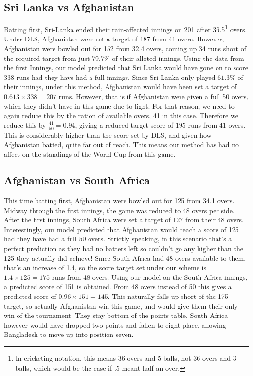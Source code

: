 \subsection{Sri Lanka vs Afghanistan}
Batting first, Sri-Lanka ended their rain-affected innings on 201 after 36.5\footnote{In cricketing notation, this means 36 overs and 5 balls, not 36 overs and 3 balls, which would be the case if .5 meant half an over.} overs.
Under DLS, Afghanistan were set a target of 187 from 41 overs. However, Afghanistan were bowled out for 152 from 32.4 overs, coming up 34 runs short of the required target from just 79.7\% of their alloted innings. 
Using the data from the first Innings, our model predicted that Sri Lanka would have gone on to score 338 runs had they have had a full innings. Since Sri Lanka only played $61.3\%$ of their innings, under this method, Afghanistan 
would have been set a target of $0.613 \times 338 = 207 \text{ runs}$. However, that is if Afghanistan were given a full 50 overs, which they didn't have in this game due to light. For that reason, we need 
to again reduce this by the ration of available overs, 41 in this case. Therefore we reduce this by $\frac{41}{50}=0.94$, giving a reduced target score of $195$ runs from 41 overs. This is considerably higher than the 
score set by DLS, and given how Afghanistan batted, quite far out of reach. This means our method has had no affect on the standings of the World Cup from this game.

\subsection{Afghanistan vs South Africa}
This time batting first, Afghanistan were bowled out for 125 from 34.1 overs. Midway through the first innings, the game was reduced to 48 overs per side. After the first innings, South Africa were set 
a target of 127 from their 48 overs. Interestingly, our model predicted that Afghanistan would reach a score of 125 had they have had a full 50 overs. Strictly speaking, in this scenario that's a perfect prediction 
as they had no batters left so couldn't go any higher than the 125 they actually did achieve! Since South Africa had 48 overs available to them, that's an increase of 1.4, so the score target set under our scheme
is $1.4 \times 125 = 175$ runs from 48 overs. Using our model on the South Africa innings, a predicted score of 151 is obtained. From 48 overs instead of 50 this gives a predicted score of $0.96 \times 151 = 145$. 
This naturally falls up short of the 175 target, so actually Afghanistan win this game, and would give them their only win of the tournament. They stay bottom of the points table, South Africa however would have 
dropped two points and fallen to eight place, allowing Bangladesh to move up into position seven. 

